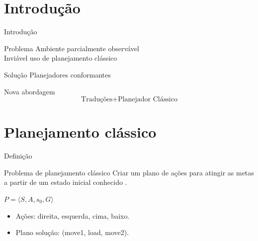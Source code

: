 \begin{frame}
  \titlepage
\end{frame}


\section{Introdução}
\begin{frame}{Introdução}
    
    \begin{block}{Problema}
        Ambiente parcialmente observável\\
        \pause
        Inviável uso de planejamento clássico
    \end{block}
    \pause
    \begin{block}{Solução}
        Planejadores conformantes
    \end{block}
    \pause
    \begin{block}{Nova abordagem}
        \[ \text{Traduções} + \text{Planejador Clássico} \]
    \end{block}

\end{frame}


\section{Planejamento clássico}
\begin{frame}{Definição}
    \begin{block}{Problema de planejamento clássico}
        Criar um plano de ações para atingir as metas a partir de um estado 
inicial conhecido \cite{Ghallab:2004}. \\
        \begin{center}
            $P = \langle S, A, s_0, G \rangle$
        \end{center}
    \end{block}
    
    \begin{multicols}{2}
        \centering
    \columnbreak
        \begin{itemize}
        \item Ações: direita, esquerda, cima, baixo.
        
        \item Plano solução: (move1, load, move2).
        \end{itemize} 
    \end{multicols}
    
\end{frame}

